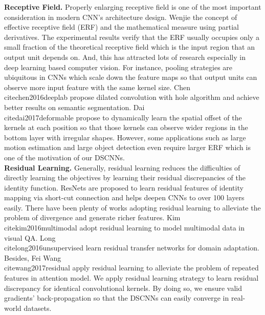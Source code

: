 \documentclass[runningheads]{llncs}
\begin{document}
\noindent\textbf{Receptive Field.}
Properly enlarging receptive field is one of the most important consideration in modern CNN's architecture design. Wenjie \etal \propose the concept of effective receptive field (ERF) and the mathematical measure using partial derivatives. The experimental results verify that the ERF usually occupies only a small fraction of the theoretical receptive field \cite{Luo2016UnderstandingTE} which is the input region that an output unit depends on. And, this has attracted lots of research especially in deep learning based computer vision. For instance, pooling strategies are ubiquitous in CNNs which scale down the feature maps so that output units can observe more input feature with the same kernel size. 
Chen \etal\\cite{chen2016deeplab} propose dilated convolution with hole algorithm and achieve better results on semantic segmentation. 
Dai \etal\\cite{dai2017deformable} propose to dynamically learn the spatial offset of the kernels at each position so that those kernels can observe wider regions in the bottom layer with irregular shapes. 
However, some applications such as large motion estimation and large object detection even require larger ERF which is one of the motivation of our DSCNNs. \\

\noindent\textbf{Residual Learning.}
Generally, residual learning reduces the difficulties of directly learning the objectives by learning their residual discrepancies of the identity function. 
ResNets \cite{He_2016_CVPR} are proposed to learn residual features of identity mapping via short-cut connection and helps deepen CNNs to over 100 layers easily. There have been plenty of works adopting residual learning to alleviate the problem of divergence and generate richer features. Kim \etal\\cite{kim2016multimodal} adopt residual learning to model multimodal data in visual QA. Long \etal\\cite{long2016unsupervised} learn residual transfer networks for domain adaptation. Besides, Fei Wang \etal\\cite{wang2017residual} apply residual learning to alleviate the problem of repeated features in attention model. We apply residual learning strategy to learn residual discrepancy for identical convolutional kernels. By doing so, we ensure valid gradients' back-propagation so that the DSCNNs can easily converge in real-world datasets. \\
\end{document}
